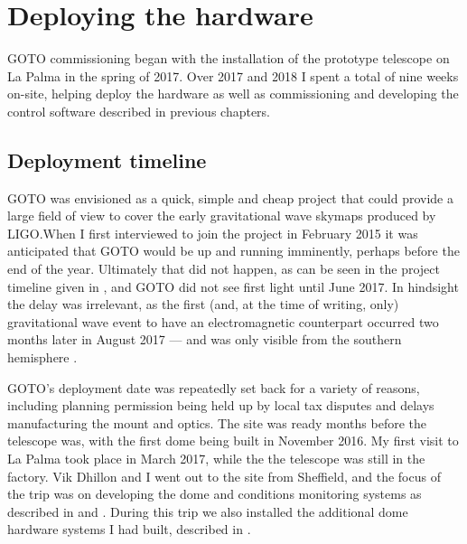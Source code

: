 \section{Deploying the hardware}
\label{sec:hardware_commissioning}
\begin{colsection}


\begin{colsection}

GOTO commissioning began with the installation of the prototype telescope on La Palma in the spring of 2017. Over 2017 and 2018 I spent a total of nine weeks on-site, helping deploy the hardware as well as commissioning and developing the control software described in previous chapters.

\end{colsection}


\subsection{Deployment timeline}
\label{sec:timeline}
\begin{colsection}

GOTO was envisioned as a quick, simple and cheap project that could provide a large field of view to cover the early gravitational wave skymaps produced by LIGO.\@ When I first interviewed to join the project in February 2015 it was anticipated that GOTO would be up and running imminently, perhaps before the end of the year. Ultimately that did not happen, as can be seen in the project timeline given in , and GOTO did not see first light until June 2017. In hindsight the delay was irrelevant, as the first (and, at the time of writing, only) gravitational wave event to have an electromagnetic counterpart occurred two months later in August 2017 --- and was only visible from the southern hemisphere \citep{GW170817,GW170817_followup}.

GOTO's deployment date was repeatedly set back for a variety of reasons, including planning permission being held up by local tax disputes and delays manufacturing the mount and optics. The site was ready months before the telescope was, with the first dome being built in November 2016. My first visit to La Palma took place in March 2017, while the the telescope was still in the factory. Vik Dhillon and I went out to the site from Sheffield, and the focus of the trip was on developing the dome and conditions monitoring systems as described in  and . During this trip we also installed the additional dome hardware systems I had built, described in .


\end{colsection}
\end{colsection}
